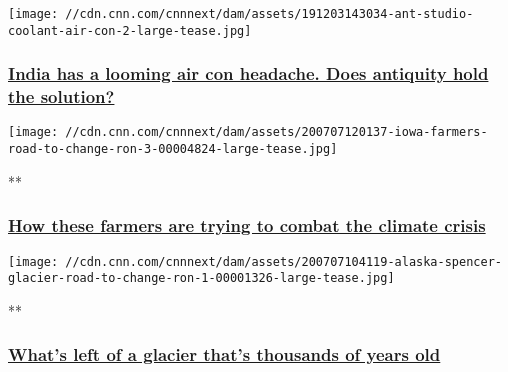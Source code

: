 \href{/style/article/india-air-conditioning-ant-studio/index.html}{}

\texttt{[image: //cdn.cnn.com/cnnnext/dam/assets/191203143034-ant-studio-coolant-air-con-2-large-tease.jpg]}

\hypertarget{india-has-a-looming-air-con-headache-does-antiquity-hold-the-solution}{%
\subsubsection{\texorpdfstring{\href{/style/article/india-air-conditioning-ant-studio/index.html}{India
has a looming air con headache. Does antiquity hold the
solution?}}{India has a looming air con headache. Does antiquity hold the solution?}}\label{india-has-a-looming-air-con-headache-does-antiquity-hold-the-solution}}

\href{/videos/weather/2020/07/07/iowa-farmers-road-to-change-ron-3.cnn}{}

\texttt{[image: //cdn.cnn.com/cnnnext/dam/assets/200707120137-iowa-farmers-road-to-change-ron-3-00004824-large-tease.jpg]}

**

\hypertarget{how-these-farmers-are-trying-to-combat-the-climate-crisis}{%
\subsubsection{\texorpdfstring{\href{/videos/weather/2020/07/07/iowa-farmers-road-to-change-ron-3.cnn}{How
these farmers are trying to combat the climate
crisis}}{How these farmers are trying to combat the climate crisis}}\label{how-these-farmers-are-trying-to-combat-the-climate-crisis}}

\href{/videos/weather/2020/07/07/alaska-spencer-glacier-road-to-change-ron-1.cnn}{}

\texttt{[image: //cdn.cnn.com/cnnnext/dam/assets/200707104119-alaska-spencer-glacier-road-to-change-ron-1-00001326-large-tease.jpg]}

**

\hypertarget{whats-left-of-a-glacier-thats-thousands-of-years-old}{%
\subsubsection{\texorpdfstring{\href{/videos/weather/2020/07/07/alaska-spencer-glacier-road-to-change-ron-1.cnn}{What's
left of a glacier that's thousands of years
old}}{What's left of a glacier that's thousands of years old}}\label{whats-left-of-a-glacier-thats-thousands-of-years-old}}

